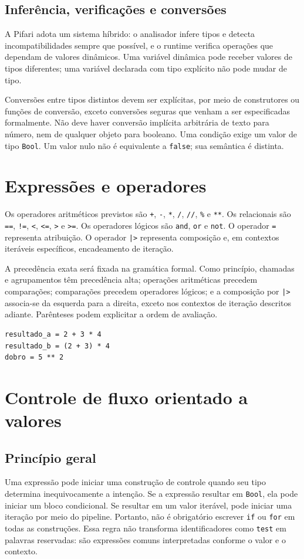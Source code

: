 \documentclass[12pt,a4paper]{article}
\begin{document}
\subsection{Inferência, verificações e conversões}
A Pifari adota um sistema híbrido: o analisador infere tipos e detecta incompatibilidades sempre que possível, e o runtime verifica operações que dependam de valores dinâmicos. Uma variável dinâmica pode receber valores de tipos diferentes; uma variável declarada com tipo explícito não pode mudar de tipo.

Conversões entre tipos distintos devem ser explícitas, por meio de construtores ou funções de conversão, exceto conversões seguras que venham a ser especificadas formalmente. Não deve haver conversão implícita arbitrária de texto para número, nem de qualquer objeto para booleano. Uma condição exige um valor de tipo \texttt{Bool}. Um valor nulo não é equivalente a \texttt{false}; sua semântica é distinta.

\section{Expressões e operadores}
Os operadores aritméticos previstos são \texttt{+}, \texttt{-}, \texttt{*}, \texttt{/}, \texttt{//}, \texttt{\%} e \texttt{**}. Os relacionais são \texttt{==}, \texttt{!=}, \texttt{<}, \texttt{<=}, \texttt{>} e \texttt{>=}. Os operadores lógicos são \texttt{and}, \texttt{or} e \texttt{not}. O operador \texttt{=} representa atribuição. O operador \texttt{|>} representa composição e, em contextos iteráveis específicos, encadeamento de iteração.

A precedência exata será fixada na gramática formal. Como princípio, chamadas e agrupamentos têm precedência alta; operações aritméticas precedem comparações; comparações precedem operadores lógicos; e a composição por \texttt{|>} associa-se da esquerda para a direita, exceto nos contextos de iteração descritos adiante. Parênteses podem explicitar a ordem de avaliação.

\begin{lstlisting}
resultado_a = 2 + 3 * 4
resultado_b = (2 + 3) * 4
dobro = 5 ** 2
\end{lstlisting}

\section{Controle de fluxo orientado a valores}
\subsection{Princípio geral}
Uma expressão pode iniciar uma construção de controle quando seu tipo determina inequivocamente a intenção. Se a expressão resultar em \texttt{Bool}, ela pode iniciar um bloco condicional. Se resultar em um valor iterável, pode iniciar uma iteração por meio do pipeline. Portanto, não é obrigatório escrever \texttt{if} ou \texttt{for} em todas as construções. Essa regra não transforma identificadores como \texttt{test} em palavras reservadas: são expressões comuns interpretadas conforme o valor e o contexto.
\end{document}
